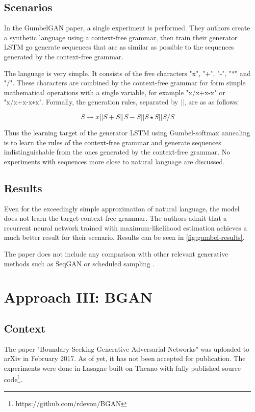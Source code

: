 \documentclass[a4paper,conference]{IEEEtran}
\begin{document}
\subsection{Scenarios}
In the GumbelGAN paper, a single experiment is performed. They authors create a synthetic language using a context-free grammar, then train their generator LSTM go generate sequences that are as similar as possible to the sequences generated by the context-free grammar. 

The language is very simple. It consists of the five characters "x", "+", "-", "*" and "/". These characters are combined by the context-free grammar for form simple mathematical operations with a single variable, for example "x/x+x-x" or "x/x+x-x∗x". Formally, the generation rules, separated by $||$, are as as follows:

\begin{dmath}
S \rightarrow x || S+S || S-S || S \star S || S/S
\end{dmath}

Thus the learning target of the generator LSTM using Gumbel-softmax annealing is to learn the rules of the context-free grammar and generate sequences indistinguishable from the ones generated by the context-free grammar. No experiments with sequences more close to natural language are discussed.

\subsection{Results}

Even for the exceedingly simple approximation of natural language, the model does not learn the target context-free grammar. The authors admit that a recurrent neural network trained with maximum-likelihood estimation achieves a much better result for their scenario. Results can be seen in \ref{fig:gumbel-results}.

The paper does not include any comparison with other relevant generative methods such as SeqGAN \cite{c7} or scheduled sampling \cite{c12}.

\section{Approach III: BGAN}
\subsection{Context}
The paper "Boundary-Seeking Generative Adversarial Networks" \cite{c17} was uploaded to arXiv in February 2017. As of yet, it has not been accepted for publication. The experiments were done in Lasagne \cite{c18} built on Theano \cite{c19} with fully published source code\footnote{https://github.com/rdevon/BGAN}. 
\end{document}

